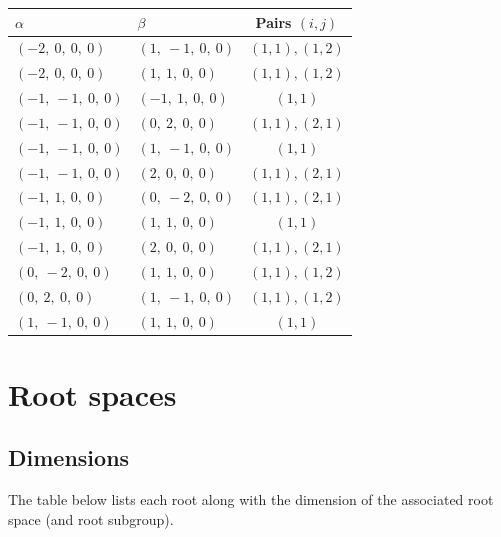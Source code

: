 \documentclass[11pt]{article}
\theoremstyle{definition}
\begin{document}
\begin{tabular}{|l|l|c|}
    \hline
    $\alpha$ & $\beta$ & Pairs $(i,j)$ \\
    \hline
    $\left( -2, \  0, \  0, \  0\right)$ & $\left( 1, \  -1, \  0, \  0\right)$ & $(1,1), (1,2)$ \\
    \hline
    $\left( -2, \  0, \  0, \  0\right)$ & $\left( 1, \  1, \  0, \  0\right)$ & $(1,1), (1,2)$ \\
    \hline
    $\left( -1, \  -1, \  0, \  0\right)$ & $\left( -1, \  1, \  0, \  0\right)$ & $(1,1)$ \\
    \hline
    $\left( -1, \  -1, \  0, \  0\right)$ & $\left( 0, \  2, \  0, \  0\right)$ & $(1,1), (2,1)$ \\
    \hline
    $\left( -1, \  -1, \  0, \  0\right)$ & $\left( 1, \  -1, \  0, \  0\right)$ & $(1,1)$ \\
    \hline
    $\left( -1, \  -1, \  0, \  0\right)$ & $\left( 2, \  0, \  0, \  0\right)$ & $(1,1), (2,1)$ \\
    \hline
    $\left( -1, \  1, \  0, \  0\right)$ & $\left( 0, \  -2, \  0, \  0\right)$ & $(1,1), (2,1)$ \\
    \hline
    $\left( -1, \  1, \  0, \  0\right)$ & $\left( 1, \  1, \  0, \  0\right)$ & $(1,1)$ \\
    \hline
    $\left( -1, \  1, \  0, \  0\right)$ & $\left( 2, \  0, \  0, \  0\right)$ & $(1,1), (2,1)$ \\
    \hline
    $\left( 0, \  -2, \  0, \  0\right)$ & $\left( 1, \  1, \  0, \  0\right)$ & $(1,1), (1,2)$ \\
    \hline
    $\left( 0, \  2, \  0, \  0\right)$ & $\left( 1, \  -1, \  0, \  0\right)$ & $(1,1), (1,2)$ \\
    \hline
    $\left( 1, \  -1, \  0, \  0\right)$ & $\left( 1, \  1, \  0, \  0\right)$ & $(1,1)$ \\
    \hline
\end{tabular}


\newpage
\section{Root spaces}

\subsection{Dimensions}

The table below lists each root along with the dimension of the associated root space (and root subgroup).
\end{document}
